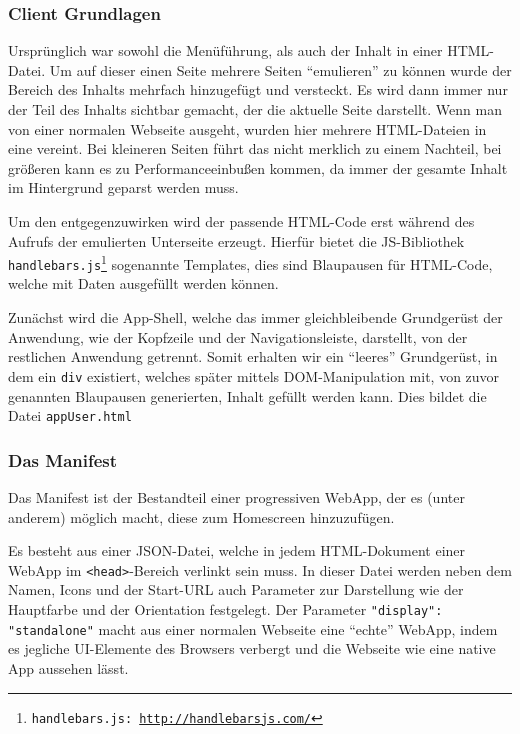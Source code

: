 \documentclass[a4paper,12pt,ngerman,listof=numbered]{scrartcl}      %
\providecommand{\inlinecode}[1]{\texttt{#1}}
\begin{document}
	\subsubsection{Client Grundlagen}
	Ursprünglich war sowohl die Me\-nü\-füh\-rung, als auch der Inhalt in einer HTML-Datei. Um auf dieser einen Seite mehrere Seiten ``emulieren'' zu können wurde der Bereich des Inhalts mehrfach hinzugefügt und versteckt. Es wird dann immer nur der Teil des Inhalts sichtbar gemacht, der die aktuelle Seite darstellt. Wenn man von einer normalen Webseite ausgeht, wurden hier mehrere HTML-Dateien in eine vereint. Bei kleineren Seiten führt das nicht merklich zu einem Nachteil, bei größeren kann es zu Performanceeinbußen kommen, da immer der gesamte Inhalt im Hintergrund geparst werden muss.\par
	Um den entgegenzuwirken wird der passende HTML-Code erst während des Aufrufs der emulierten Unterseite erzeugt. Hierfür bietet die JS-Bibliothek \inlinecode{handle\-bars.js\footnote{\inlinecode{handlebars.js}: \url{http://handlebarsjs.com/}}} sogenannte Templates, dies sind Blaupausen für HTML-Code, welche mit Daten ausgefüllt werden können.\par
	Zunächst wird die App-Shell, welche das immer gleichbleibende Grundgerüst der Anwendung, wie der Kopfzeile und der Navigations\-leiste, darstellt, von der restlichen Anwendung getrennt. Somit erhalten wir ein ``leeres'' Grundgerüst, in dem ein \inlinecode{div} existiert, welches später mittels DOM-Manipulation mit, von zuvor genannten Blaupausen generierten, Inhalt gefüllt werden kann. Dies bildet die Datei \inlinecode{appUser.html}\par
	
	\subsubsection{Das Manifest}
	Das Manifest ist der Bestandteil einer progressiven WebApp, der es (unter anderem) möglich macht, diese zum Homescreen hinzuzufügen.\par
	Es besteht aus einer JSON-Datei, welche in jedem HTML-Dokument einer WebApp im \inlinecode{<head>}-Bereich verlinkt sein muss. In dieser Datei werden neben dem Namen, Icons und der Start-URL auch Parameter zur Darstellung wie der Hauptfarbe und der Orientation festgelegt. Der Parameter \inlinecode{"{}display"{}: "{}standalone"{}} macht aus einer normalen Webseite eine ``echte'' WebApp, indem es jegliche UI-Elemente des Browsers verbergt und die Webseite wie eine native App aussehen lässt.\par
	
\end{document}
